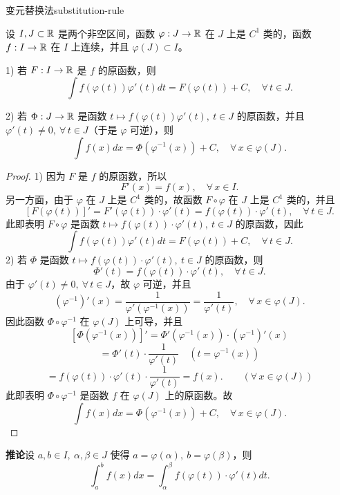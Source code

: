 \begin{mythm}{变元替换法}{substitution-rule}

	设 \(I,J\subset\mathbb{R}\) 是两个非空区间，函数 \(\varphi:J\to\mathbb{R}\) 在 \(J\) 上是 \(C^1\) 类的，函数 \(f:I\to\mathbb{R}\) 在 \(I\) 上连续，并且 \(\varphi(J)\subset I\)。

	1) 若 \(F:I\to\mathbb{R}\) 是 \(f\) 的原函数，则
	\[
	\int f(\varphi(t))\varphi'(t)dt=F(\varphi(t))+C,\quad\forall\,t\in J.
	\]

	2) 若 \(\Phi:J\to\mathbb{R}\) 是函数 \(t\longmapsto f(\varphi(t))\varphi'(t),\ t\in J\) 的原函数，并且 \(\varphi'(t)\neq0,\ \forall\,t\in J\)（于是 \(\varphi\) 可逆），则
	\[
	\int f(x)dx=\Phi(\varphi^{-1}(x))+C,\quad\forall\,x\in\varphi(J).
	\]

\end{mythm}

\begin{proof}

	1) 因为 \(F\) 是 \(f\) 的原函数，所以
	\[
	F'(x)=f(x),\quad\forall\,x\in I.
	\]
	另一方面，由于 \(\varphi\) 在 \(J\) 上是 \(C^1\) 类的，故函数 \(F\circ\varphi\) 在 \(J\) 上是 \(C^1\) 类的，并且
	\[
	[F(\varphi(t))]'=F'(\varphi(t))\cdot\varphi'(t)=f(\varphi(t))\cdot\varphi'(t),\quad\forall\,t\in J.
	\]
	此即表明 \(F\circ\varphi\) 是函数 \(t\longmapsto f(\varphi(t))\cdot\varphi'(t),\ t\in J\) 的原函数，因此
	\[
	\int f(\varphi(t))\varphi'(t)dt=F(\varphi(t))+C,\quad\forall\,t\in J.
	\]
	2) 若 \(\Phi\) 是函数 \(t\longmapsto f(\varphi(t))\cdot\varphi'(t),\ t\in J\) 的原函数，则
	\[
	\Phi'(t)=f(\varphi(t))\cdot\varphi'(t),\quad\forall\,t\in J.
	\]
	由于 \(\varphi'(t)\neq0,\ \forall\,t\in J\)，故 \(\varphi\) 可逆，并且
	\[
	(\varphi^{-1})'(x)=\frac1{\varphi'(\varphi^{-1}(x))}=\frac1{\varphi'(t)},\quad\forall\,x\in\varphi(J).
	\]
	因此函数 \(\Phi\circ\varphi^{-1}\) 在 \(\varphi(J)\) 上可导，并且
	\[
	[\Phi(\varphi^{-1}(x))]'=\Phi'(\varphi^{-1}(x))\cdot(\varphi^{-1})'(x)
	\]
	\[
	=\Phi'(t)\cdot\frac1{\varphi'(t)}\quad(t=\varphi^{-1}(x))
	\]
	\[
	=f(\varphi(t))\cdot\varphi'(t)\cdot\frac1{\varphi'(t)}=f(x).\qquad(\forall\,x\in\varphi(J))
	\]
	此即表明 \(\Phi\circ\varphi^{-1}\) 是函数 \(f\) 在 \(\varphi(J)\) 上的原函数。故
	\[
	\int f(x)dx=\Phi(\varphi^{-1}(x))+C,\quad\forall\,x\in\varphi(J).
	\]

\end{proof}

\textbf{推论}\quad 设 \(a,b\in I,\ \alpha,\beta\in J\) 使得 \(a=\varphi(\alpha),\ b=\varphi(\beta)\)，则
\[
\int_a^b f(x)dx=\int_\alpha^\beta f(\varphi(t))\cdot\varphi'(t)dt.
\]

